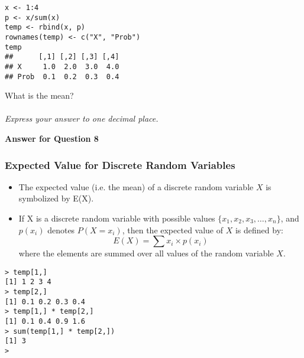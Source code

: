 \documentclass[]{article}
\begin{document}
\begin{framed}
\begin{verbatim}
x <- 1:4
p <- x/sum(x)
temp <- rbind(x, p)
rownames(temp) <- c("X", "Prob")
temp
##      [,1] [,2] [,3] [,4]
## X     1.0  2.0  3.0  4.0
## Prob  0.1  0.2  0.3  0.4
\end{verbatim}
\end{framed}
\noindent What is the mean? 
\\ 
\\
\textit{Express your answer to one decimal place.}

\newpage
\noindent \textbf{Answer for Question 8}


\subsubsection*{Expected Value for Discrete Random Variables}

\begin{itemize}
	\item The expected value (i.e. the mean) of a discrete random variable $X$ is symbolized by E(X).
	
	\item If X is a discrete random variable with possible values $\{ x_1, x_2, x_3,\ldots , x_n\}$, and $p(x_i)$ denotes $P(X = x_i)$, then the expected value of $X$ is defined by:
	{
		\Large
	\[
	E(X) = \sum x_i \times p(x_i)
	\]
}
	where the elements are summed over all values of the random variable $X$.
	
\end{itemize}
\bigskip
{
	\Large
\begin{verbatim}
> temp[1,]
[1] 1 2 3 4
> temp[2,]
[1] 0.1 0.2 0.3 0.4
> temp[1,] * temp[2,]
[1] 0.1 0.4 0.9 1.6
> sum(temp[1,] * temp[2,])
[1] 3
> 
\end{verbatim}
}
\end{document}

